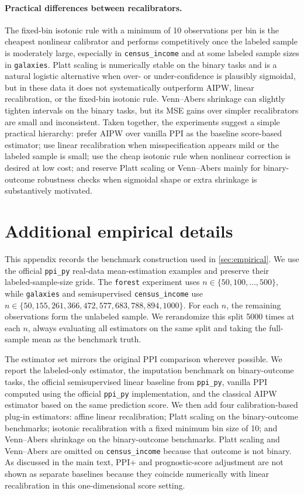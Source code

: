 \documentclass{article}
\begin{document}
\paragraph{Practical differences between recalibrators.}
The fixed-bin isotonic rule with a minimum of 10 observations per bin is the cheapest nonlinear calibrator and performs competitively once the labeled sample is moderately large, especially in \texttt{census\_income} and at some labeled sample sizes in \texttt{galaxies}. Platt scaling is numerically stable on the binary tasks and is a natural logistic alternative when over- or under-confidence is plausibly sigmoidal, but in these data it does not systematically outperform AIPW, linear recalibration, or the fixed-bin isotonic rule. Venn--Abers shrinkage can slightly tighten intervals on the binary tasks, but its MSE gains over simpler recalibrators are small and inconsistent. Taken together, the experiments suggest a simple practical hierarchy: prefer AIPW over vanilla PPI as the baseline score-based estimator; use linear recalibration when misspecification appears mild or the labeled sample is small; use the cheap isotonic rule when nonlinear correction is desired at low cost; and reserve Platt scaling or Venn--Abers mainly for binary-outcome robustness checks when sigmoidal shape or extra shrinkage is substantively motivated.

\appendix

\section{Additional empirical details}
\label{app:empirical}
This appendix records the benchmark construction used in \cref{sec:empirical}. We use the official \texttt{ppi\_py} real-data mean-estimation examples and preserve their labeled-sample-size grids. The \texttt{forest} experiment uses \(n \in \{50,100,\dots,500\}\), while \texttt{galaxies} and semisupervised \texttt{census\_income} use \(n \in \{50,155,261,366,472,577,683,788,894,1000\}\). For each \(n\), the remaining observations form the unlabeled sample. We rerandomize this split 5000 times at each \(n\), always evaluating all estimators on the same split and taking the full-sample mean as the benchmark truth.

The estimator set mirrors the original PPI comparison wherever possible. We report the labeled-only estimator, the imputation benchmark on binary-outcome tasks, the official semisupervised linear baseline from \texttt{ppi\_py}, vanilla PPI computed using the official \texttt{ppi\_py} implementation, and the classical AIPW estimator based on the same prediction score. We then add four calibration-based plug-in estimators: affine linear recalibration; Platt scaling on the binary-outcome benchmarks; isotonic recalibration with a fixed minimum bin size of 10; and Venn--Abers shrinkage on the binary-outcome benchmarks. Platt scaling and Venn--Abers are omitted on \texttt{census\_income} because that outcome is not binary. As discussed in the main text, PPI+ and prognostic-score adjustment are not shown as separate baselines because they coincide numerically with linear recalibration in this one-dimensional score setting.
\end{document}
